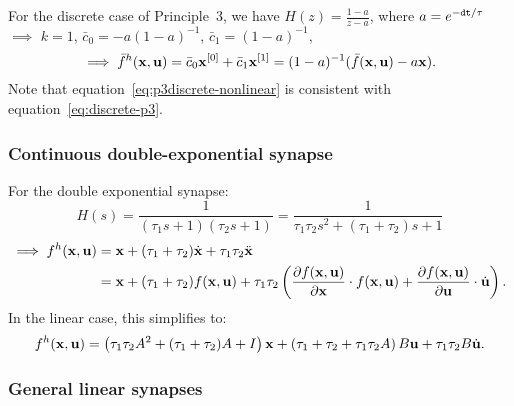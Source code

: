 For the discrete case of Principle~3, we have $H(z) = \frac{1 - a}{z - a}$, where $a = e^{-\texttt{dt}{} / \tau}$ $\implies$ $k = 1$, $\bar{c}_0 = -a(1 - a)^{-1}$, $\bar{c}_1 = (1 - a)^{-1}$,
\begin{equation} \label{eq:p3discrete-nonlinear}
\implies \bar{f}^h(\mathbf{x}, \mathbf{u}) = \bar{c}_0 \mathbf{x}^{[0]} + \bar{c}_1 \mathbf{x}^{[1]} =  (1 - a)^{-1}(\bar{f}(\mathbf{x}, \mathbf{u}) - a\mathbf{x}) \text{.}
\end{equation}
Note that equation~\ref{eq:p3discrete-nonlinear} is consistent with equation~\ref{eq:discrete-p3}.

\subsubsection{Continuous double-exponential synapse}

For the double exponential synapse:
\begin{equation} \label{eq:double-exp}
H(s) = \frac{1}{(\tau_1 s + 1)(\tau_2 s + 1)} = \frac{1}{\tau_1 \tau_2 s^2 + (\tau_1 + \tau_2)s + 1}
\end{equation}
\begin{align} \label{eq:double-exp-solution}
\implies f^h(\mathbf{x}, \mathbf{u}) &= \mathbf{x} + (\tau_1 + \tau_2) \dot{\mathbf{x}} + \tau_1 \tau_2 \ddot{\mathbf{x}} \nonumber \\
&= \mathbf{x} + (\tau_1 + \tau_2) f(\mathbf{x}, \mathbf{u}) + \tau_1 \tau_2 \left( \frac{\partial f(\mathbf{x}, \mathbf{u})}{\partial \mathbf{x}} \cdot f(\mathbf{x}, \mathbf{u}) + \frac{\partial f(\mathbf{x}, \mathbf{u})}{\partial \mathbf{u}} \cdot \dot{\mathbf{u}} \right) \text{.}
\end{align}
In the linear case, this simplifies to:
\begin{align*}
f^h(\mathbf{x}, \mathbf{u}) = \left( \tau_1 \tau_2 A^2 + (\tau_1 + \tau_2) A + I \right) \mathbf{x} + \left( \tau_1 + \tau_2 + \tau_1 \tau_2 A \right) B \mathbf{u} + \tau_1 \tau_2 B \dot{\mathbf{u}} \text{.}
\end{align*}

\subsubsection{General linear synapses}

